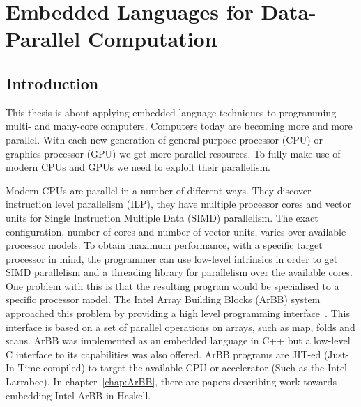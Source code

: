 \documentclass[a4paper]{book}
\newcommand{\thesistitle}{Embedded Languages for Data-Parallel Computation}
\begin{document}

\tableofcontents


\cleardoublepage
\clearpage

\pagestyle{fancy}
\fancyfoot{}
\fancyhead[LO]{}
\fancyhead[RO]{\leftmark}
\renewcommand{\headrulewidth}{0.0pt}
\fancyhead[LE,RO]{\thepage}

%
%
\chapter{\thesistitle}

\section{Introduction} 

This thesis is about applying embedded language techniques to programming 
multi- and many-core computers. Computers today are becoming more and more  
parallel. With each new generation of 
general purpose processor (CPU) or graphics processor (GPU) we get more 
parallel resources. To fully make use of modern CPUs and GPUs we need to
exploit their parallelism. 

Modern CPUs are parallel in a number of different ways. They discover instruction
level parallelism (ILP), they have multiple processor cores and vector units for 
Single Instruction Multiple Data (SIMD)  parallelism. The exact configuration, number
of cores and number of vector units, varies over available processor models. 
To obtain maximum performance, with a specific target processor in mind, the programmer
can use low-level intrinsics in order to get SIMD parallelism and a threading library
for parallelism over the available cores. One problem with this is that the resulting program 
would be specialised to a specific processor model. The Intel Array Building Blocks (ArBB) 
system approached this problem by providing a high level programming interface~\citet{ARBB2011}.
This interface is based on a set of parallel operations on arrays, such as map, folds 
and scans. ArBB was implemented as an embedded language in C++ but a low-level C interface to 
its capabilities was also offered. ArBB programs are JIT-ed (Just-In-Time compiled) to 
target the available CPU or accelerator (Such as the Intel Larrabee). In 
chapter~\ref{chap:ArBB}, there are papers describing work towards embedding Intel 
ArBB in Haskell. 
\end{document}
